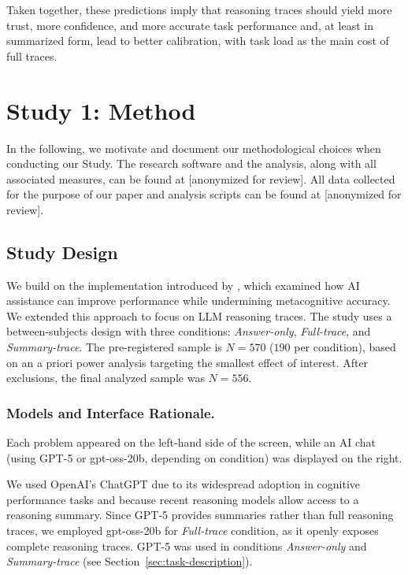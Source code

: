 \documentclass[manuscript,review,anonymous]{acmart}
\begin{document}
Taken together, these predictions imply that reasoning traces should yield more trust, more confidence, and more accurate task performance and, at least in summarized form, lead to better calibration, with task load as the main cost of full traces.

\section{Study 1: Method}

In the following, we motivate and document our methodological choices when conducting our Study. The research software and the analysis, along with all associated measures, can be found at [anonymized for review]. All data collected for the purpose of our paper and analysis scripts can be found at [anonymized for review].

\subsection{Study Design}
We build on the implementation introduced by \citet{FERNANDES2026108779}, which examined how AI assistance can improve performance while undermining metacognitive accuracy. We extended this approach to focus on LLM reasoning traces. %
The study uses a between-subjects design with three conditions: \textit{Answer-only}, \textit{Full-trace}, and \textit{Summary-trace}. The pre-registered sample is $N=570$ ($190$ per condition), based on an a priori power analysis targeting the smallest effect of interest. After exclusions, the final analyzed sample was $N=556$.%


\subsubsection{Models and Interface Rationale.}
Each problem appeared on the left-hand side of the screen, while an AI chat (using GPT-5 or gpt-oss-20b, depending on condition) was displayed on the right. %

We used OpenAI's ChatGPT due to its widespread adoption in cognitive performance tasks \cite{bastani2024generative,draxlerghost24,draxler2023gender} and because recent reasoning models allow access to a reasoning summary. Since GPT-5 provides summaries rather than full reasoning traces, we employed gpt-oss-20b for \textit{Full-trace} condition, as it openly exposes complete reasoning traces. GPT-5 was used in conditions \textit{Answer-only} and \textit{Summary-trace} (see Section~\ref{sec:task-description}).%
\end{document}
